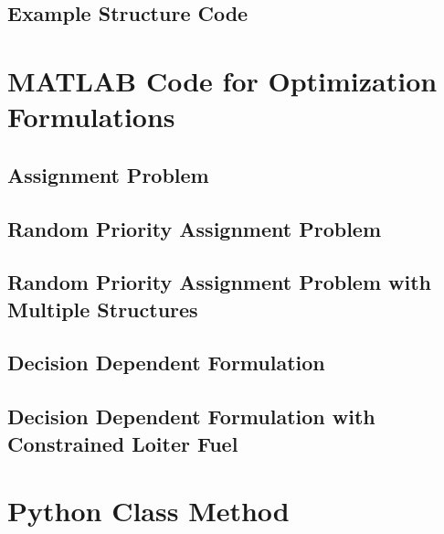 \section{Example Structure Code}


\chapter{MATLAB Code for Optimization Formulations}
\renewcommand\thesection{\Alpha {A}}
\section{Assignment Problem}


\renewcommand\thesection{\Alpha {B}}
\section{Random Priority Assignment Problem}


\renewcommand\thesection{\Alpha {C}}
\section{Random Priority Assignment Problem with Multiple Structures}


\renewcommand\thesection{\Alpha {D}}
\section{Decision Dependent Formulation}


\renewcommand\thesection{\Alpha {E}}
\section{Decision Dependent Formulation with Constrained Loiter Fuel}


\chapter{Python Class Method}
\renewcommand\thesection{\Alpha {A}}
